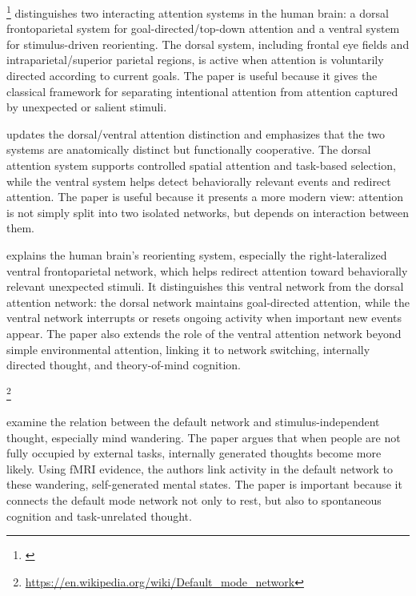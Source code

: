 \documentclass{book}
\providecommand{\seeherefooter}[1]{\footnote{\url{#1}}}
\begin{document}

\seeherefooter{}
    \cite{corbetta-2002-control-of-goal-directed-and-stimulus-driven-attention-in-the-brain} distinguishes two interacting attention systems in the human brain: a dorsal frontoparietal system for goal-directed/top-down attention and a ventral system for stimulus-driven reorienting. The dorsal system, including frontal eye fields and intraparietal/superior parietal regions, is active when attention is voluntarily directed according to current goals. The paper is useful because it gives the classical framework for separating intentional attention from attention captured by unexpected or salient stimuli.
    
    \cite{vossel-2014-dorsal-and-ventral-attention-systems} updates the dorsal/ventral attention distinction and emphasizes that the two systems are anatomically distinct but functionally cooperative. The dorsal attention system supports controlled spatial attention and task-based selection, while the ventral system helps detect behaviorally relevant events and redirect attention. The paper is useful because it presents a more modern view: attention is not simply split into two isolated networks, but depends on interaction between them.
    
    \cite{corbetta-2008-the-reorienting-system-of-the-human-brain-from-environment-to-theory-of-mind} explains the human brain’s reorienting system, especially the right-lateralized ventral frontoparietal network, which helps redirect attention toward behaviorally relevant unexpected stimuli. It distinguishes this ventral network from the dorsal attention network: the dorsal network maintains goal-directed attention, while the ventral network interrupts or resets ongoing activity when important new events appear. The paper also extends the role of the ventral attention network beyond simple environmental attention, linking it to network switching, internally directed thought, and theory-of-mind cognition.


\seeherefooter{https://en.wikipedia.org/wiki/Default_mode_network}

    \cite{mason-2007-wandering-minds-the-default-network-and-stimulus-independent-thought} examine the relation between the default network and stimulus-independent thought, especially mind wandering. The paper argues that when people are not fully occupied by external tasks, internally generated thoughts become more likely. Using fMRI evidence, the authors link activity in the default network to these wandering, self-generated mental states. The paper is important because it connects the default mode network not only to rest, but also to spontaneous cognition and task-unrelated thought.
\end{document}
